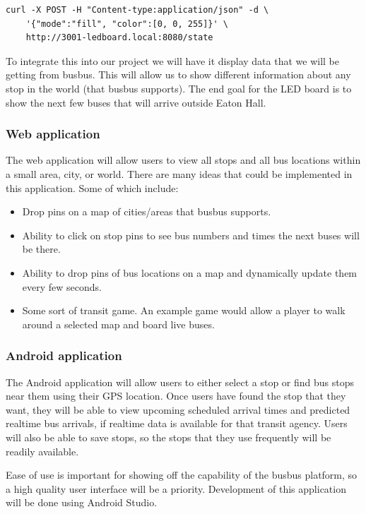 \documentclass[12pt]{article}
\begin{document}
\begin{verbatim}
curl -X POST -H "Content-type:application/json" -d \
    '{"mode":"fill", "color":[0, 0, 255]}' \
    http://3001-ledboard.local:8080/state
\end{verbatim}

To integrate this into our project
we will have it display data that we will be getting from busbus.  This will allow
us to show different information about any stop in the world (that
busbus supports). The end goal for the LED board is to show the next few buses that will arrive outside Eaton Hall.

\subsubsection{Web application}
The web application will allow users to view all stops and all bus locations within a small area, city, or world.
There are many ideas that could be implemented in this application. Some of which include:

\begin{itemize}
    \item Drop pins on a map of cities/areas that busbus supports.
    \item Ability to click on stop pins to see bus numbers and times the next buses will be there.
    \item Ability to drop pins of bus locations on a map and dynamically update them every few seconds.
    \item Some sort of transit game. An example game would allow a player to walk around a selected map and board live buses.
\end{itemize}

\subsubsection{Android application}
The Android application will allow users to either select a stop or find bus stops near them using their GPS location.
Once users have found the stop that they want, they will be able to view upcoming scheduled arrival times and
predicted realtime bus arrivals, if realtime data is available for that transit agency. Users will also be able
to save stops, so the stops that they use frequently will be readily available.

Ease of use is important
for showing off the capability of the busbus platform, so a high quality user interface will be a priority.
Development of this application will be done using Android Studio.
\end{document}
